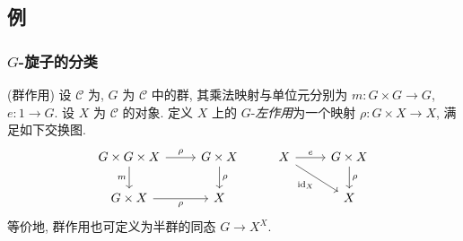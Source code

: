 \subsection{例}

\subsubsection{$G$-旋子的分类\topos{}}

\begin{definition}
	{(群作用)}
	设 $\mathcal C$ 为\topos{}, $G$ 为 $\mathcal C$ 中的群, 其乘法映射与单位元分别为 $m\colon G\times G\to G$, $e\colon 1\to G$. 设 $X$ 为 $\mathcal C$ 的对象. 定义 $X$ 上的 $G$-\emph{左作用}为一个映射 $\rho\colon G\times X\to X$, 满足如下交换图.
	\[\begin{tikzcd}[ampersand replacement=\&]
		{G\times G\times X} \& {G\times X} \& X \& {G\times X} \\
		{G\times X} \& X \&\& X
		\arrow["m"', from=1-1, to=2-1]
		\arrow["\rho", from=1-1, to=1-2]
		\arrow["\rho"', from=2-1, to=2-2]
		\arrow["\rho", from=1-2, to=2-2]
		\arrow["{\operatorname{id}_X}"', from=1-3, to=2-4]
		\arrow["e", from=1-3, to=1-4]
		\arrow["\rho", from=1-4, to=2-4]
	\end{tikzcd}\]
	等价地, 群作用也可定义为半群的同态 $G\to X^X$.
\end{definition}



